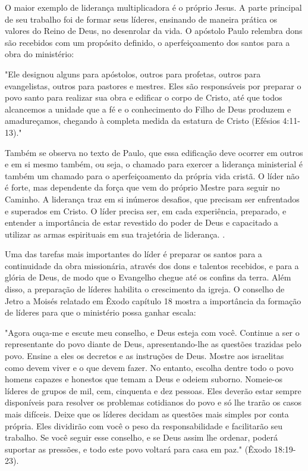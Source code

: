 \documentclass[12pt,openright,oneside,a4paper]{abntex2}
\begin{document}
O maior exemplo de liderança multiplicadora é o próprio Jesus. A parte principal de seu trabalho foi de formar seus líderes, ensinando de maneira prática os valores do Reino de Deus, no desenrolar da vida. O apóstolo Paulo relembra dons são recebidos com um propósito definido, o aperfeiçoamento dos santos para a obra do ministério: 

\begin{citacao}"Ele designou alguns para apóstolos, outros para profetas, outros para evangelistas, outros para pastores e mestres. Eles são responsáveis por preparar o povo santo para realizar sua obra e edificar o corpo de Cristo, até que todos alcancemos a unidade que a fé e o conhecimento do Filho de Deus produzem e amadureçamos, chegando à completa medida da estatura de Cristo (Efésios 4:11-13)."\end{citacao}

Também se observa no texto de Paulo, que essa edificação deve ocorrer em outros e em si mesmo também, ou seja, o chamado para exercer a liderança ministerial é também um chamado para o aperfeiçoamento da própria vida cristã. O líder não é forte, mas dependente da força que vem do próprio Mestre para seguir no Caminho\cite[p. 130,131]{brandao}. A liderança traz em si inúmeros desafios, que precisam ser enfrentados e superados em Cristo. O líder precisa ser, em cada experiência, preparado, e entender a importância de estar revestido do poder de Deus e capacitado a utilizar as armas espirituais em sua trajetória de liderança. \cite[p. 132]{brandao}.

Uma das tarefas mais importantes do líder é preparar os santos para a continuidade da obra missionária, através dos dons e talentos recebidos, e para a glória de Deus, de modo que o Evangelho chegue até os confins da terra. Além disso, a preparação de líderes habilita o crescimento da igreja. O conselho de Jetro a Moisés relatado em Êxodo capítulo 18 mostra a importância da formação de líderes para que o ministério possa ganhar escala: 

\begin{citacao}"Agora ouça-me e escute meu conselho, e Deus esteja com você. Continue a ser o representante do povo diante de Deus, apresentando-lhe as questões trazidas pelo povo. Ensine a eles os decretos e as instruções de Deus. Mostre aos israelitas como devem viver e o que devem fazer. No entanto, escolha dentre todo o povo homens capazes e honestos que temam a Deus e odeiem suborno. Nomeie-os líderes de grupos de mil, cem, cinquenta e dez pessoas. Eles deverão estar sempre disponíveis para resolver os problemas cotidianos do povo e só lhe trarão os casos mais difíceis. Deixe que os líderes decidam as questões mais simples por conta própria. Eles dividirão com você o peso da responsabilidade e facilitarão seu trabalho. Se você seguir esse conselho, e se Deus assim lhe ordenar, poderá suportar as pressões, e todo este povo voltará para casa em paz." (Êxodo 18:19-23).\end{citacao}
\end{document}
